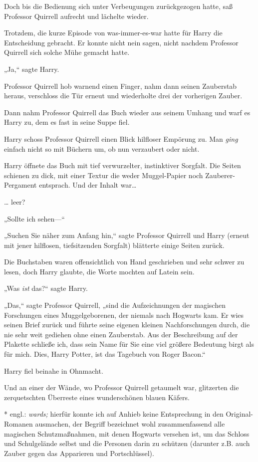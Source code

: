 {Doch bis die Bedienung sich unter Verbeugungen zurückgezogen hatte, saß Professor Quirrell aufrecht und lächelte wieder.

Trotzdem, die kurze Episode von was-immer-es-war hatte für Harry die Entscheidung gebracht. Er konnte nicht nein sagen, nicht nachdem Professor Quirrell sich solche Mühe gemacht hatte.

„Ja,“ sagte Harry.

Professor Quirrell hob warnend einen Finger, nahm dann seinen Zauberstab heraus, verschloss die Tür erneut und wiederholte drei der vorherigen Zauber.

Dann nahm Professor Quirrell das Buch wieder aus seinem Umhang und warf es Harry zu, dem es fast in seine Suppe fiel.

Harry schoss Professor Quirrell einen Blick hilfloser Empörung zu. Man \emph{ging} einfach nicht so mit Büchern um, ob nun verzaubert oder nicht.

Harry öffnete das Buch mit tief verwurzelter, instinktiver Sorgfalt. Die Seiten schienen zu dick, mit einer Textur die weder Muggel-Papier noch Zauberer-Pergament entsprach. Und der Inhalt war…

… leer?

„Sollte ich sehen—“

„Suchen Sie näher zum Anfang hin,“ sagte Professor Quirrell und Harry (erneut mit jener hilflosen, tiefsitzenden Sorgfalt) blätterte einige Seiten zurück.

Die Buchstaben waren offensichtlich von Hand geschrieben und sehr schwer zu lesen, doch Harry glaubte, die Worte mochten auf Latein sein.

„Was \emph{ist} das?“ sagte Harry.

„Das,“ sagte Professor Quirrell, „sind die Aufzeichnungen der magischen Forschungen eines Muggelgeborenen, der niemals nach Hogwarts kam. Er wies seinen Brief zurück und führte seine eigenen kleinen Nachforschungen durch, die nie sehr weit gediehen ohne einen Zauberstab. Aus der Beschreibung auf der Plakette schließe ich, dass sein Name für Sie eine viel größere Bedeutung birgt als für mich. Dies, Harry Potter, ist das Tagebuch von Roger Bacon.“

Harry fiel beinahe in Ohnmacht.

Und an einer der Wände, wo Professor Quirrell getaumelt war, glitzerten die zerquetschten Überreste eines wunderschönen blauen Käfers.

* engl.: \emph{wards;} hierfür konnte ich auf Anhieb keine Entsprechung in den Original-Romanen ausmachen, der Begriff bezeichnet wohl zusammenfassend alle magischen Schutzmaßnahmen, mit denen Hogwarts versehen ist, um das Schloss und Schulgelände selbst und die Personen darin zu schützen (darunter z.B. auch Zauber gegen das Apparieren und Portschlüssel).

}
